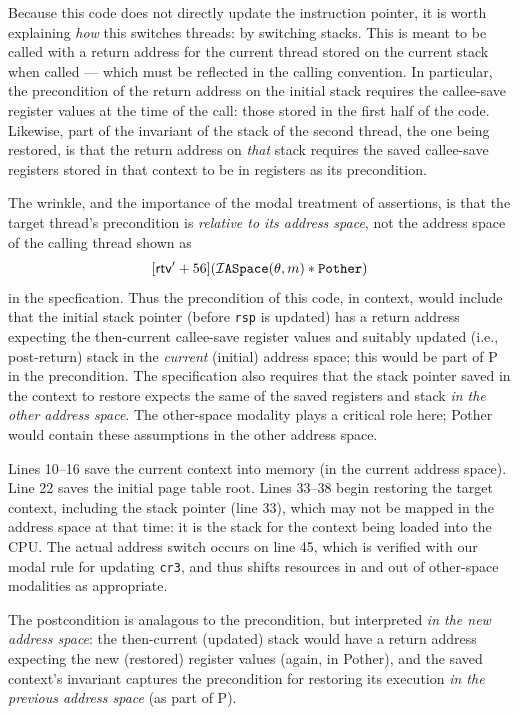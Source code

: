 \documentclass[acmsmall,screen,nonacm]{acmart}
\begin{document}
Because this code does not directly update the instruction pointer, it is worth explaining \emph{how} this switches threads: by switching stacks. This is meant to be called with a return address for the current thread stored on the current stack when called --- which must be reflected in the calling convention. In particular, the precondition of the return address on the initial stack requires the callee-save register values at the time of the call: those stored in the first half of the code.
Likewise, part of the invariant of the stack of the second thread, the one being restored, is that the return address on \emph{that} stack requires the saved callee-save registers stored in that context to be in registers as its precondition.

The wrinkle, and the importance of the modal treatment of assertions, is that the target thread's precondition is \emph{relative to its address space}, not the address space of the calling thread shown as 
\[[\textsf{rtv}'+56](\mathcal{I}\texttt{ASpace}(\theta,m) \ast \texttt{Pother})\]
in the specfication. 
Thus the precondition of this code,
in context, would include that the initial stack pointer (before \lstinline|rsp| is updated)
has a return address expecting the then-current callee-save register values and 
suitably updated (i.e., post-return) stack in the \emph{current} (initial) address space;
this would be part of \textsf{P} in the precondition.
The specification also requires that
the stack pointer saved in the context to restore expects the same of the saved registers and stack 
\emph{in the other address space}. 
The other-space modality plays a critical role here; \textsf{Pother} would contain these assumptions in the other
address space.

Lines 10--16 save the current context into memory (in the current address space).
Line 22 saves the initial page table root.
Lines 33--38 begin restoring the target context, including the stack pointer (line 33),
which may not be mapped in the address space at that time: it is the stack for the context being
loaded into the CPU.
The actual address switch occurs on line 45, which is verified with our modal rule for updating \lstinline|cr3|,
and thus shifts resources in and out of other-space modalities as appropriate.

The postcondition is analagous to the precondition, but interpreted \emph{in the new address space}: the then-current (updated) stack would have a return address expecting the new (restored) register values (again, in \textsf{Pother}),
and the saved context's invariant captures the precondition for restoring its execution \emph{in the previous address space} (as part of \textsf{P}). 
%
\end{document}
